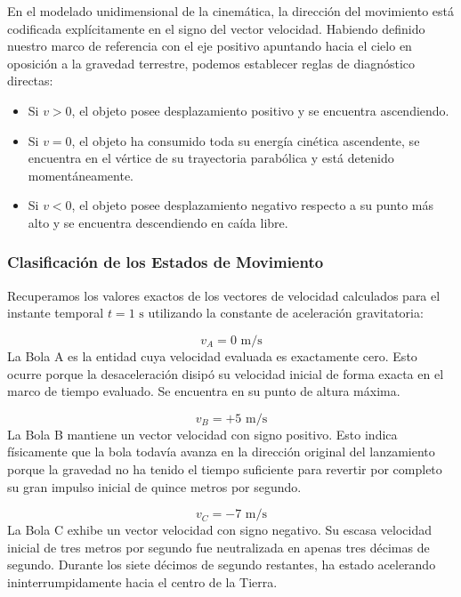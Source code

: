 \documentclass[12pt, a4paper]{article}
\begin{document}
En el modelado unidimensional de la cinemática, la dirección del movimiento está codificada explícitamente en el signo del vector velocidad. Habiendo definido nuestro marco de referencia con el eje positivo apuntando hacia el cielo en oposición a la gravedad terrestre, podemos establecer reglas de diagnóstico directas:
\begin{itemize}
    \item Si $v > 0$, el objeto posee desplazamiento positivo y se encuentra ascendiendo.
    \item Si $v = 0$, el objeto ha consumido toda su energía cinética ascendente, se encuentra en el vértice de su trayectoria parabólica y está detenido momentáneamente.
    \item Si $v < 0$, el objeto posee desplazamiento negativo respecto a su punto más alto y se encuentra descendiendo en caída libre.
\end{itemize}

\subsubsection*{Clasificación de los Estados de Movimiento}

Recuperamos los valores exactos de los vectores de velocidad calculados para el instante temporal $t = 1 \text{ s}$ utilizando la constante de aceleración gravitatoria:

\begin{equation}
v_A = 0 \text{ m/s}
\end{equation}
La Bola A es la entidad cuya velocidad evaluada es exactamente cero. Esto ocurre porque la desaceleración disipó su velocidad inicial de forma exacta en el marco de tiempo evaluado. Se encuentra en su punto de altura máxima.

\begin{equation}
v_B = +5 \text{ m/s}
\end{equation}
La Bola B mantiene un vector velocidad con signo positivo. Esto indica físicamente que la bola todavía avanza en la dirección original del lanzamiento porque la gravedad no ha tenido el tiempo suficiente para revertir por completo su gran impulso inicial de quince metros por segundo.

\begin{equation}
v_C = -7 \text{ m/s}
\end{equation}
La Bola C exhibe un vector velocidad con signo negativo. Su escasa velocidad inicial de tres metros por segundo fue neutralizada en apenas tres décimas de segundo. Durante los siete décimos de segundo restantes, ha estado acelerando ininterrumpidamente hacia el centro de la Tierra.
\end{document}
